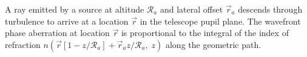 A ray emitted by a source at altitude $\mathcal{R}_{a}$ and lateral offset $\vec{r}_{a}$ descends through turbulence to arrive at a location $\vec{r}$ in the telescope pupil plane.  The wavefront phase aberration at location $\vec{r}$ is proportional to the integral of the index of refraction $n \left( \vec{r}\left[1-z/\mathcal{R}_{a}\right] + \vec{r}_{a} z/\mathcal{R}_{a}, \; z\right)$ 
along the geometric path. 
\label{fig:r_vector_schematic}
